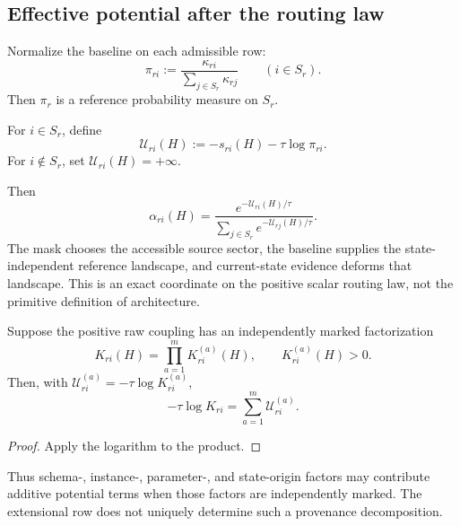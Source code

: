 \subsection{Effective potential after the routing law}\label{subsec:effective-potential}

Normalize the baseline on each admissible row:
\begin{equation}\label{eq:reference-measure}
\pi_{ri}:=\frac{\kappa_{ri}}{\sum_{j\in S_r}\kappa_{rj}}
\qquad(i\in S_r).
\end{equation}
Then $\pi_r$ is a reference probability measure on $S_r$.

\begin{definition}\label{def:effective-potential}
For $i\in S_r$, define
\begin{equation}\label{eq:effective-potential}
\mathcal U_{ri}(H):=-s_{ri}(H)-\tau\log\pi_{ri}.
\end{equation}
For $i\notin S_r$, set $\mathcal U_{ri}(H)=+\infty$.
\end{definition}

Then
\begin{equation}\label{eq:gibbs-row}
\alpha_{ri}(H)
=
\frac{e^{-\mathcal U_{ri}(H)/\tau}}
{\sum_{j\in S_r}e^{-\mathcal U_{rj}(H)/\tau}}.
\end{equation}
The mask chooses the accessible source sector, the baseline supplies the state-independent reference landscape, and current-state evidence deforms that landscape. This is an exact coordinate on the positive scalar routing law, not the primitive definition of architecture.

\begin{proposition}\label{prop:additive-potential}
Suppose the positive raw coupling has an independently marked factorization
\[
K_{ri}(H)=\prod_{a=1}^{m}K_{ri}^{(a)}(H),
\qquad K_{ri}^{(a)}(H)>0.
\]
Then, with $\mathcal U_{ri}^{(a)}=-\tau\log K_{ri}^{(a)}$,
\[
-\tau\log K_{ri}=\sum_{a=1}^{m}\mathcal U_{ri}^{(a)}.
\]
\end{proposition}

\begin{proof}
Apply the logarithm to the product.
\end{proof}

Thus schema-, instance-, parameter-, and state-origin factors may contribute additive potential terms when those factors are independently marked. The extensional row does not uniquely determine such a provenance decomposition.

